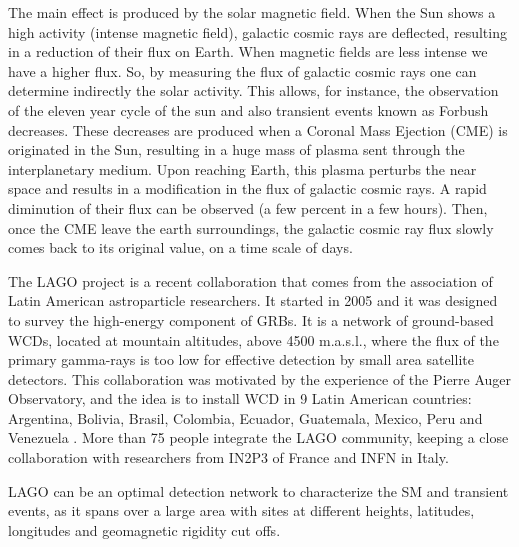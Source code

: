 The main effect is produced by the solar magnetic field. When the Sun shows a
high activity (intense magnetic field), galactic cosmic rays are deflected,
resulting in a reduction of their flux on Earth. When magnetic fields are less
intense we have a higher flux. So, by measuring the flux of galactic cosmic
rays one can determine indirectly the solar activity. This allows, for
instance, the observation of the eleven year cycle of the sun and also
transient events known as Forbush decreases. These decreases are produced
when a Coronal Mass Ejection (CME) is originated in the Sun, resulting in a
huge mass of plasma sent through the interplanetary medium. Upon reaching
Earth, this plasma perturbs the near space and results in a modification in the
flux of galactic cosmic rays. A rapid diminution of their flux can be
observed (a few percent in a few hours). Then, once the CME leave the earth surroundings,
the galactic cosmic ray flux slowly comes back to its original value, on a time
scale of days.

The LAGO project is a recent collaboration that comes from the association of
Latin American astroparticle researchers. It started in 2005 and it was
designed to survey the high-energy component of GRBs. It is a network of
ground-based WCDs, located at mountain altitudes, above 4500 m.a.s.l., where
the flux of the primary gamma-rays is too low for effective detection by small
area satellite detectors. This collaboration was motivated by the experience of
the Pierre Auger Observatory, and the idea is to install WCD in 9 Latin
American countries: Argentina, Bolivia, Brasil, Colombia, Ecuador, Guatemala,
Mexico, Peru and Venezuela \cite{Allard2008,Allard2009b}. More than 75 people
integrate the LAGO community, keeping a close collaboration with researchers
from IN2P3 of France and INFN in Italy.

LAGO can be an optimal detection network to characterize the SM and transient
events, as it spans over a large area with sites at different heights, latitudes,
longitudes and geomagnetic rigidity cut offs.

